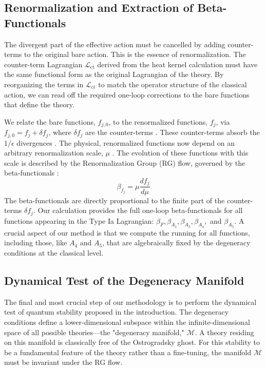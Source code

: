 \documentclass[twocolumn]{aastex631}
\begin{document}
\subsection{Renormalization and Extraction of Beta-Functionals}
The divergent part of the effective action must be cancelled by adding counter-terms to the original bare action. \citep{hochberg1998renormalizationgroupimprovingeffective,codello2015computingeffectiveactionfunctional} This is the essence of renormalization. The counter-term Lagrangian $\mathcal{L}_{\text{ct}}$ derived from the heat kernel calculation must have the same functional form as the original Lagrangian of the theory. \citep{codello2015computingeffectiveactionfunctional} By reorganizing the terms in $\mathcal{L}_{\text{ct}}$ to match the operator structure of the classical action, we can read off the required one-loop corrections to the bare functions that define the theory. \citep{codello2015computingeffectiveactionfunctional}

We relate the bare functions, $f_{j,0}$, to the renormalized functions, $f_j$, via $f_{j,0} = f_j + \delta f_j$, where $\delta f_j$ are the counter-terms \citep{actis2006twolooprenormalizationstandardmodel,mathiot2018renormalizationgroupequationsrevisited}. These counter-terms absorb the $1/\epsilon$ divergences \citep{freedman1992cutoffprocedurecountertermsdifferential,li2012introductionrenormalizationfieldtheory}. The physical, renormalized functions now depend on an arbitrary renormalization scale, $\mu$ \citep{mathiot2018renormalizationgroupequationsrevisited}. The evolution of these functions with this scale is described by the Renormalization Group (RG) flow, governed by the beta-functionals \citep{mathiot2018renormalizationgroupequationsrevisited}:
\begin{equation}\beta_{f_j} = \mu \frac{d f_j}{d\mu}\end{equation}
\citep{sonoda2003betafunctionsintegralequation,vanbaalen2008qedbetafunctionglobalsolutions,vanbaalen2009qcdbetafunctionglobalsolutions}
The beta-functionals are directly proportional to the finite part of the counter-terms $\delta f_j$. Our calculation provides the full one-loop beta-functionals for all functions appearing in the Type Ia Lagrangian: $\beta_F, \beta_{A_1}, \beta_{A_3}, \beta_{A_4},$ and $\beta_{A_5}$. A crucial aspect of our method is that we compute the running for all functions, including those, like $A_4$ and $A_5$, that are algebraically fixed by the degeneracy conditions at the classical level.

\subsection{Dynamical Test of the Degeneracy Manifold}
The final and most crucial step of our methodology is to perform the dynamical test of quantum stability proposed in the introduction. The degeneracy conditions define a lower-dimensional subspace within the infinite-dimensional space of all possible theories---the "degeneracy manifold," $\mathcal{M}$. A theory residing on this manifold is classically free of the Ostrogradsky ghost. For this stability to be a fundamental feature of the theory rather than a fine-tuning, the manifold $\mathcal{M}$ must be invariant under the RG flow.
\end{document}
